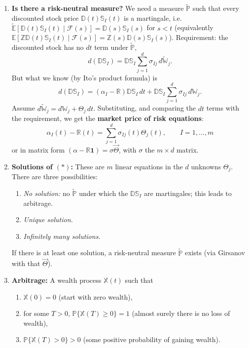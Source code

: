 \begin{enumerate}
    \item \textbf{Is there a risk-neutral measure?} We need a measure $\tilde{\mathbb{P}}$ such that every discounted stock price $\mathbb{D}(t)\mathbb{S}_I(t)$ is a martingale, i.e.\ $\tilde{\mathbb{E}}[\mathbb{D}(t)\mathbb{S}_I(t) \mid \mathcal{F}(s)] = \mathbb{D}(s)\mathbb{S}_I(s)$ for $s < t$ (equivalently $\mathbb{E}[\mathbb{Z}\mathbb{D}(t)\mathbb{S}_I(t) \mid \mathcal{F}(s)] = \mathbb{Z}(s)\mathbb{D}(s)\mathbb{S}_I(s)$). Requirement: the discounted stock has no $dt$ term under $\tilde{\mathbb{P}}$,
    \[d(\mathbb{D}\mathbb{S}_I) = \mathbb{D}\mathbb{S}_I\sum_{j=1}^{d}\sigma_{Ij}\, d\tilde{\mathbb{W}}_j.\]
    But what we know (by Ito's product formula) is
    \[d(\mathbb{D}\mathbb{S}_I) = (\alpha_I - \mathbb{R})\mathbb{D}\mathbb{S}_I\, dt + \mathbb{D}\mathbb{S}_I\sum_{j=1}^{d}\sigma_{Ij}\, d\mathbb{W}_j.\]
    Assume $d\tilde{\mathbb{W}}_j = d\mathbb{W}_j + \Theta_j\, dt$. Substituting, and comparing the $dt$ terms with the requirement, we get the \textbf{market price of risk equations}:
    \[\boxed{\alpha_I(t) - \mathbb{R}(t) = \sum_{j=1}^{d}\sigma_{Ij}(t)\Theta_j(t), \qquad I = 1, \dots, m} \tag{$\ast$}\]
    or in matrix form $(\alpha - \mathbb{R}\mathbf{1}) = \sigma\vec{\Theta}$, with $\sigma$ the $m \times d$ matrix.

    \item \textbf{Solutions of $(\ast)$:} These are $m$ linear equations in the $d$ unknowns $\Theta_j$. There are three possibilities:
    \begin{enumerate}
        \item \textit{No solution:} no $\tilde{\mathbb{P}}$ under which the $\mathbb{D}\mathbb{S}_I$ are martingales; this leads to arbitrage.
        \item \textit{Unique solution.}
        \item \textit{Infinitely many solutions.}
    \end{enumerate}
    If there is at least one solution, a risk-neutral measure $\tilde{\mathbb{P}}$ exists (via Girsanov with that $\vec{\Theta}$).

    \item \textbf{Arbitrage:} A wealth process $\mathbb{X}(t)$ such that
    \begin{enumerate}
        \item $\mathbb{X}(0) = 0$ (start with zero wealth),
        \item for some $T > 0$, $\mathbb{P}\{\mathbb{X}(T) \geq 0\} = 1$ (almost surely there is no loss of wealth),
        \item $\mathbb{P}\{\mathbb{X}(T) > 0\} > 0$ (some positive probability of gaining wealth).
    \end{enumerate}


\end{enumerate}
